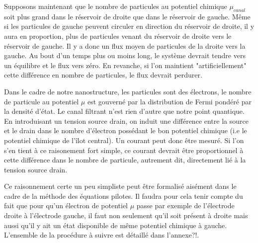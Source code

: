 Supposons maintenant que le nombre de particules au potentiel chimique $\mu_{canal}$ soit plus grand dans le réservoir de droite que dans le réservoir de gauche. M\^eme si les particules de gauche peuvent circuler en direction du réservoir de droite, il y aura en proportion, plus de particules venant du réservoir de droite vers le réservoir de gauche. Il y a donc un flux moyen de particules de la droite vers la gauche. Au bout d'un temps plus ou moins long, le système devrait tendre vers un équilibre et le flux vers zéro. En revanche, si l'on maintient "artificiellement" cette différence en nombre de particules, le flux devrait perdurer.

Dans le cadre de notre nanostructure, les particules sont des électrons, le nombre de particule au potentiel $\mu$ est gouverné par la distribution de Fermi pondéré par la densité d'état. Le canal filtrant n'est rien d'autre que notre point quantique. En introduisant un tension source drain, on induit une différence entre la source et le drain dans le nombre d'électron possédant le bon potentiel chimique (i.e le potentiel chimique de l'\^ilot central). Un courant peut donc \^etre mesuré. Si l'on s'en tient à ce raisonement fort simple, ce courant devrait \^etre proportionnel à cette différence dans le nombre de particule, autrement dit, directement lié à la tension source drain.

Ce raisonnement certe un peu simpliste peut \^etre formalisé aisément dans le cadre de la méthode des équations pilotes. Il faudra pour cela tenir compte du fait que pour qu'un électron de potentiel $\mu$ passe par exemple de l'électrode droite à l'électrode gauche, il faut non seulement qu'il soit présent à droite mais aussi qu'il y ait un état disponible de m\^eme potentiel chimique à gauche. L'ensemble de la procédure à suivre est détaillé dans l'annexe?!.



